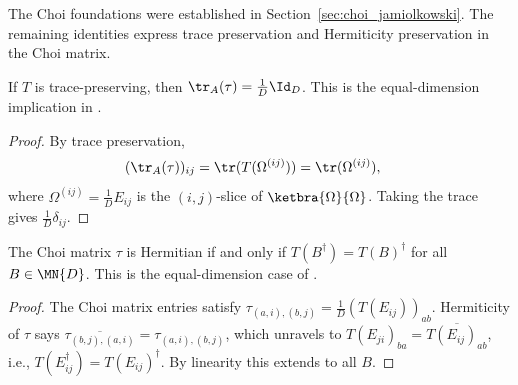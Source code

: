 The Choi foundations were established in Section~\ref{sec:choi_jamiolkowski}. The
remaining identities express trace preservation and Hermiticity preservation
in the Choi matrix.

\begin{theorem}\label{thm:traceLeft_choiMatrix_of_tp}
    \leanok
    If $T$ is trace-preserving, then
    $\tr_A(\tau) = \frac{1}{D} \Id_D$.
    This is the equal-dimension implication in
    \cite[Proposition~2.1]{Wolf2012Quantum}.
\end{theorem}

\begin{proof}
    \leanok
    By trace preservation,
    \begin{align}
        (\tr_A(\tau))_{ij}
        &= \tr(T(\Omega^{(ij)}))
         = \tr(\Omega^{(ij)}),
        \notag
    \end{align}
    where $\Omega^{(ij)} = \frac{1}{D} E_{ij}$ is the $(i,j)$-slice of
    $\ketbra{\Omega}{\Omega}$.
    Taking the trace gives $\frac{1}{D}\delta_{ij}$.
\end{proof}

\begin{theorem}\label{thm:choiMatrix_isHermitian_iff_hermiticityPreserving}
    \leanok
    The Choi matrix $\tau$ is Hermitian if and only if
    $T(B^\dagger) = T(B)^\dagger$ for all $B \in \MN{D}$.
    This is the equal-dimension case of
    \cite[Proposition~2.1]{Wolf2012Quantum}.
\end{theorem}

\begin{proof}
    \leanok
    The Choi matrix entries satisfy
    $\tau_{(a,i),(b,j)} = \frac{1}{D}(T(E_{ij}))_{ab}$.
    Hermiticity of $\tau$ says
    $\overline{\tau_{(b,j),(a,i)}} = \tau_{(a,i),(b,j)}$, which
    unravels to $T(E_{ji})_{ba} = \overline{T(E_{ij})_{ab}}$, i.e.,
    $T(E_{ij}^\dagger) = T(E_{ij})^\dagger$.
    By linearity this extends to all $B$.
\end{proof}

